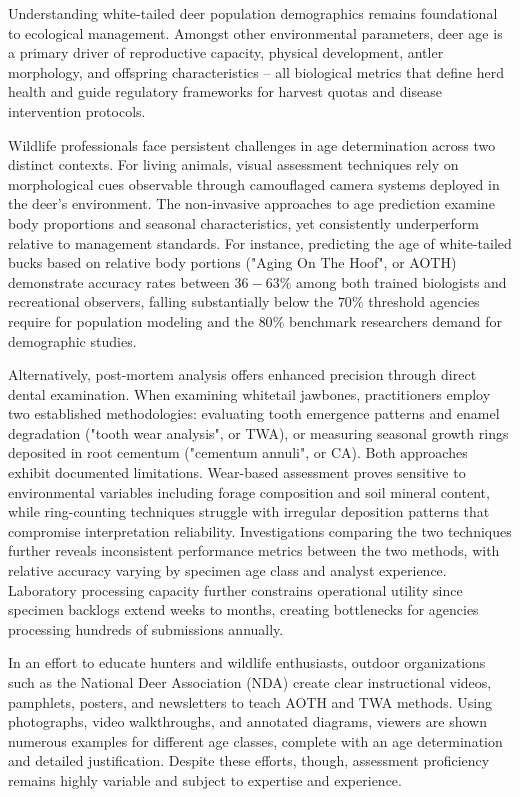 \documentclass{iopjournal}
\begin{document}
Understanding white-tailed deer population demographics remains foundational to ecological management. Amongst other environmental parameters, deer age is a primary driver of reproductive capacity, physical development, antler morphology, and offspring characteristics -- all biological metrics that define herd health and guide regulatory frameworks for harvest quotas and disease intervention protocols.

Wildlife professionals face persistent challenges in age determination across two distinct contexts. For living animals, visual assessment techniques rely on morphological cues observable through camouflaged camera systems deployed in the deer's environment. The non-invasive approaches to age prediction examine body proportions and seasonal characteristics, yet consistently underperform relative to management standards. For instance, predicting the age of white-tailed bucks based on relative body portions ("Aging On The Hoof", or AOTH) demonstrate accuracy rates between $36-63\%$ among both trained biologists and recreational observers, falling substantially below the $70\%$ threshold agencies require for population modeling and the $80\%$ benchmark researchers demand for demographic studies.

Alternatively, post-mortem analysis offers enhanced precision through direct dental examination. When examining whitetail jawbones, practitioners employ two established methodologies: evaluating tooth emergence patterns and enamel degradation ("tooth wear analysis", or TWA), or measuring seasonal growth rings deposited in root cementum ("cementum annuli", or CA). Both approaches exhibit documented limitations. Wear-based assessment proves sensitive to environmental variables including forage composition and soil mineral content, while ring-counting techniques struggle with irregular deposition patterns that compromise interpretation reliability. Investigations comparing the two techniques further reveals inconsistent performance metrics between the two methods, with relative accuracy varying by specimen age class and analyst experience. Laboratory processing capacity further constrains operational utility since specimen backlogs extend weeks to months, creating bottlenecks for agencies processing hundreds of submissions annually.

In an effort to educate hunters and wildlife enthusiasts, outdoor organizations such as the National Deer Association (NDA) create clear instructional videos, pamphlets, posters, and newsletters to teach AOTH and TWA methods. Using photographs, video walkthroughs, and annotated diagrams, viewers are shown numerous examples for different age classes, complete with an age determination and detailed justification. Despite these efforts, though, assessment proficiency remains highly variable and subject to expertise and experience.
\end{document}
